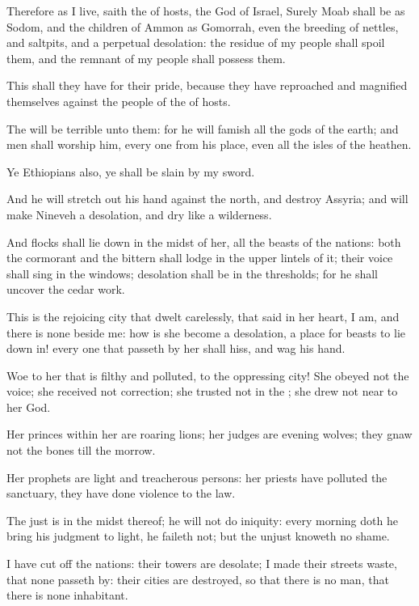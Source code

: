 \Verse Therefore as I live, saith the \LORD of hosts, the God of Israel, Surely Moab shall be as Sodom, and the children of Ammon as Gomorrah, even the breeding of nettles, and saltpits, and a perpetual desolation: the residue of my people shall spoil them, and the remnant of my people shall possess them.

\Verse This shall they have for their pride, because they have reproached and magnified themselves against the people of the \LORD of hosts.

\Verse The \LORD will be terrible unto them: for he will famish all the gods of the earth; and men shall worship him, every one from his place, even all the isles of the heathen.

\Verse Ye Ethiopians also, ye shall be slain by my sword.

\Verse And he will stretch out his hand against the north, and destroy Assyria; and will make Nineveh a desolation, and dry like a wilderness.

\Verse And flocks shall lie down in the midst of her, all the beasts of the nations: both the cormorant and the bittern shall lodge in the upper lintels of it; their voice shall sing in the windows; desolation shall be in the thresholds; for he shall uncover the cedar work.

\Verse This is the rejoicing city that dwelt carelessly, that said in her heart, I am, and there is none beside me: how is she become a desolation, a place for beasts to lie down in! every one that passeth by her shall hiss, and wag his hand.


\Chapter
\Verse Woe to her that is filthy and polluted, to the oppressing city!  \Verse She obeyed not the voice; she received not correction; she trusted not in the \LORD; she drew not near to her God.

\Verse Her princes within her are roaring lions; her judges are evening wolves; they gnaw not the bones till the morrow.

\Verse Her prophets are light and treacherous persons: her priests have polluted the sanctuary, they have done violence to the law.

\Verse The just \LORD is in the midst thereof; he will not do iniquity: every morning doth he bring his judgment to light, he faileth not; but the unjust knoweth no shame.

\Verse I have cut off the nations: their towers are desolate; I made their streets waste, that none passeth by: their cities are destroyed, so that there is no man, that there is none inhabitant.

